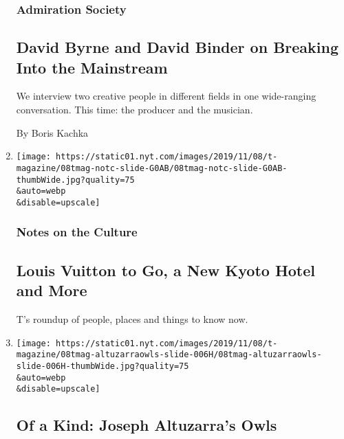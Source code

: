 \begin{enumerate}
{  \subsubsection{Admiration Society}\label{admiration-society}}

  \hypertarget{david-byrne-and-david-binder-on-breaking-into-the-mainstream}{%
  \subsection{David Byrne and David Binder on Breaking Into the
  Mainstream}\label{david-byrne-and-david-binder-on-breaking-into-the-mainstream}}

  We interview two creative people in different fields in one
  wide-ranging conversation. This time: the producer and the musician.

  By Boris Kachka
\item
  \href{/2019/11/08/t-magazine/louis-vuitton-2054-aman-kyoto-news.html}{}

  \texttt{[image: https://static01.nyt.com/images/2019/11/08/t-magazine/08tmag-notc-slide-G0AB/08tmag-notc-slide-G0AB-thumbWide.jpg?quality=75\\\&auto=webp\\\&disable=upscale]}

  \hypertarget{notes-on-the-culture-1}{%
  \subsubsection{Notes on the Culture}\label{notes-on-the-culture-1}}

  \hypertarget{louis-vuitton-to-go-a-new-kyoto-hotel-and-more}{%
  \subsection{Louis Vuitton to Go, a New Kyoto Hotel and
  More}\label{louis-vuitton-to-go-a-new-kyoto-hotel-and-more}}

  T's roundup of people, places and things to know now.
\item
  \href{/slideshow/2019/11/08/t-magazine/of-a-kind-joseph-altuzarras-owls.html}{}

  \texttt{[image: https://static01.nyt.com/images/2019/11/08/t-magazine/08tmag-altuzarraowls-slide-006H/08tmag-altuzarraowls-slide-006H-thumbWide.jpg?quality=75\\\&auto=webp\\\&disable=upscale]}

  \hypertarget{of-a-kind-joseph-altuzarras-owls}{%
  \subsection{Of a Kind: Joseph Altuzarra's
  Owls}\label{of-a-kind-joseph-altuzarras-owls}}


\end{enumerate}
